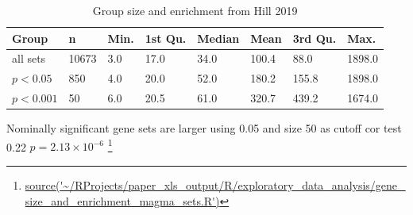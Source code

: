 \begin{table}[]
    \centering
    \begin{tabular}{llllllll}
    \toprule
   Group  & n & Min. &1st Qu. & Median  &  Mean &3rd Qu.    &Max.\\ 
   \midrule
    all sets &   10673  &3.0 &    17.0 &   34.0 &  100.4&    88.0&  1898.0 \\
      $p<0.05$ & 850 &4.0  &  20.0 &   52.0 &  180.2  & 155.8 & 1898.0 \\ 
       $p<0.001$ & 50 & 6.0&    20.5    &61.0&   320.7&   439.2  &1674.0     \\
       \bottomrule
     
    \end{tabular}
    \caption[Gene set group size and significance of enrichment]{Group size and enrichment from Hill 2019 \cite{hill2019combined}}
    \label{tab:group size and enrichment}
\end{table}



Nominally significant gene sets are larger using 0.05 and size 50 as cutoff cor test 0.22 $p = 2.13\times10^{-6}$
\footnote{\url{source('~/RProjects/paper_xls_output/R/exploratory_data_analysis/gene_size_and_enrichment_magma_sets.R')}}

